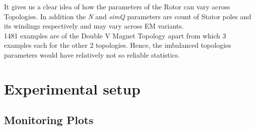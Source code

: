\documentclass{report} %
\begin{document}
It gives us a clear idea of how the parameters of the Rotor can vary across Topologies.
In addition the \textit{N} and \textit{simQ} parameters are count of Stator poles and its windings respectively and may vary across \ac{EM} variants.\\
1481 examples are of the Double V Magnet Topology apart from which 3 examples each for the other 2 topologies.
Hence, the imbalanced topologies parameters would have relatively not so reliable statistics.\\ 

\section{Experimental setup}
\label{sec:Experimental setup}

\subsection{Monitoring Plots}
\label{subsec:Monitoring Plots}
\end{document}
